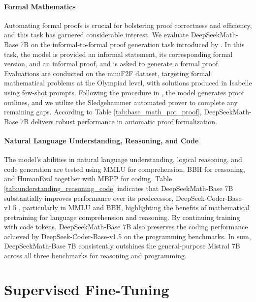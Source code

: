 \paragraph{Formal Mathematics}

Automating formal proofs is crucial for bolstering proof correctness and efficiency, and this task has garnered considerable interest. We evaluate DeepSeekMath-Base 7B on the informal-to-formal proof generation task introduced by \citep{dsp_proof}. In this task, the model is provided an informal statement, its corresponding formal version, and an informal proof, and is asked to generate a formal proof. Evaluations are conducted on the miniF2F \citep{minif2f} dataset, targeting formal mathematical problems at the Olympiad level, with solutions produced in Isabelle using few-shot prompts. Following the procedure in \cite{dsp_proof}, the model generates proof outlines, and we utilize the Sledgehammer automated prover \citep{sledgehammer} to complete any remaining gaps. According to Table \ref{tab:base_math_pot_proof}, DeepSeekMath-Base 7B delivers robust performance in automatic proof formalization.

\paragraph{Natural Language Understanding, Reasoning, and Code}

The model’s abilities in natural language understanding, logical reasoning, and code generation are tested using MMLU \citep{mmlu} for comprehension, BBH \citep{bbh} for reasoning, and HumanEval \citep{codex} together with MBPP \citep{mbpp} for coding. Table \ref{tab:understanding_reasoning_code} indicates that DeepSeekMath-Base 7B substantially improves performance over its predecessor, DeepSeek-Coder-Base-v1.5 \citep{deepseek-coder}, particularly in MMLU and BBH, highlighting the benefits of mathematical pretraining for language comprehension and reasoning. By continuing training with code tokens, DeepSeekMath-Base 7B also preserves the coding performance achieved by DeepSeek-Coder-Base-v1.5 on the programming benchmarks. In sum, DeepSeekMath-Base 7B consistently outshines the general-purpose Mistral 7B \citep{mistral} across all three benchmarks for reasoning and programming.

\section{Supervised Fine-Tuning}

